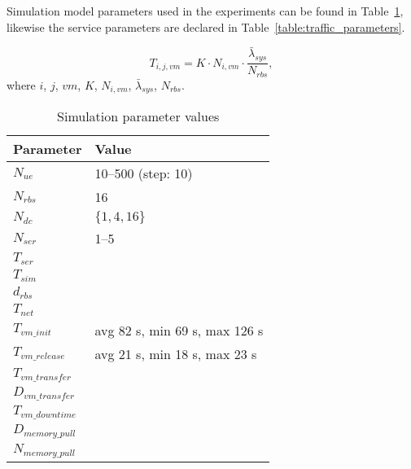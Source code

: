 Simulation model parameters used in the experiments can be found in Table~\ref{table:simulation_parameters}, likewise the service parameters are declared in Table~\ref{table:traffic_parameters}.

\begin{equation}
\label{eq:service_time}
T_{i,j,vm} = K \cdot N_{i,vm} \cdot \frac{ \bar{\lambda}_{sys} }{N_{rbs}},
\end{equation}
where $i$, $j$, $vm$, $K$, $N_{i,vm}$, $\bar{\lambda}_{sys}$, $N_{rbs}$. 

\begin{table}[tb]
 	\centering
 	
    \begin{tabular}{|l|l|} \hline
    	\textbf{Parameter}    	& \textbf{Value}			\\ \hline
    	$N_{ue}$						& 10--500 (step: 10)	\\ \hline
    	$N_{rbs}$						& 16								\\ \hline
    	$N_{dc}$						& $\{1,4,16\}$				\\ \hline
    	$N_{ser}$						& 1--5							\\ \hline
    	$T_{ser}$						& \\ \hline
    	$T_{sim}$						& \\ \hline
    	$d_{rbs}$						& \\ \hline
    	$T_{net}$						& \\ \hline
        $T_{vm\_init}$				& avg 82 s, min 69 s, max 126 s \\ \hline
        $T_{vm\_release}$		& avg 21 s, min 18 s, max 23 s \\ \hline
        $T_{vm\_transfer}$		& \\ \hline
		$D_{vm\_transfer}$		& \\ \hline
		$T_{vm\_downtime}$	& \\ \hline
		$D_{memory\_pull}$	& \\ \hline
		$N_{memory\_pull}$	& \\ \hline
    \end{tabular}
    
    \caption{Simulation parameter values}
    \label{table:simulation_parameters}
\end{table}

